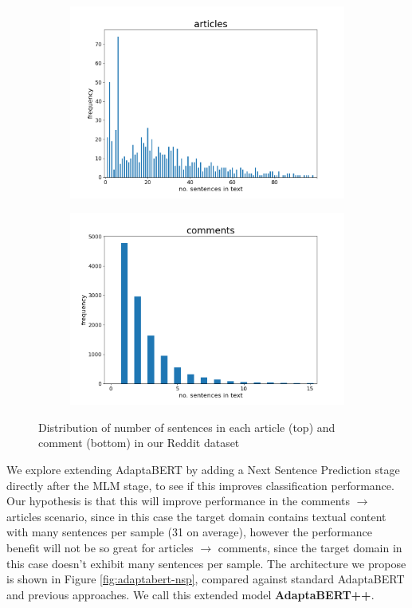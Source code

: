 \begin{figure}[ht]
    \centering
    \begin{subfigure}{\textwidth}
        \centering
        \includegraphics[scale=0.45]{0-img/num-sentences-distribution-articles.png}
    \end{subfigure}
    \begin{subfigure}{\textwidth}
        \centering
        \includegraphics[scale=0.45]{0-img/num-sentences-distribution-comments.png}
    \end{subfigure}
    \caption{Distribution of number of sentences in each article (top) and comment (bottom) in our Reddit dataset}
    \label{fig:num-sentences-distributions}
\end{figure}

We explore extending AdaptaBERT by adding a Next Sentence Prediction stage directly after the MLM stage, to see if this improves classification performance. Our hypothesis is that this will improve performance in the comments $ \rightarrow $ articles scenario, since in this case the target domain contains textual content with many sentences per sample (31 on average), however the performance benefit will not be so great for articles $ \rightarrow $ comments, since the target domain in this case doesn't exhibit many sentences per sample. The architecture we propose is shown in Figure \ref{fig:adaptabert-nsp}, compared against standard AdaptaBERT and previous approaches. We call this extended model \textbf{AdaptaBERT++}. 

